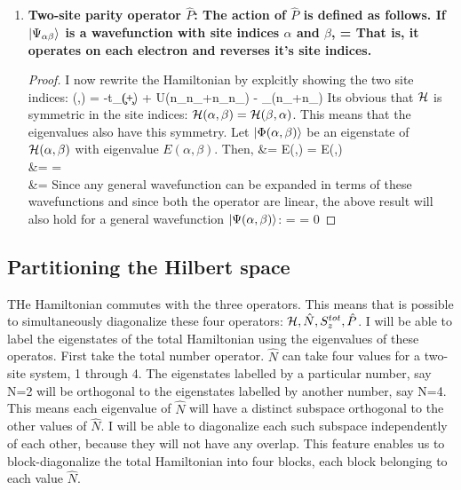 \documentclass{article}
\begin{document}
\begin{enumerate}
\item \bf{Two-site parity operator \(\hat{P}\)}: The action of \(\hat{P}\) is defined as follows. If \(\ket{\Psi_{\alpha\beta}}\) is a wavefunction with site indices \(\alpha\) and \(\beta\), 
\beq
{}\ket{\Psi(\alpha,\beta)} = \ket{\Psi(\beta,\alpha)}
\eeq
That is, it operates on each electron and reverses it's site indices. 
\begin{proof}
I now rewrite the Hamiltonian by explcitly showing the two site indices:
\beq
\ham(\alpha,\beta) = -t\sum_\sigma(\C{\alpha}{\sigma}\c{\beta}{\sigma}+\C{\beta}{\sigma}\c{\alpha}{\sigma}) + U(n_{\alpha\uparrow}n_{\alpha\downarrow}+n_{\beta\uparrow}n_{\beta\downarrow}) - \mu\sum_\sigma(n_{\alpha\sigma}+n_{\beta\sigma})
\eeq 
Its obvious that \(\mathcal{H}\) is symmetric in the site indices: \(\mathcal{H}(\alpha,\beta) = \mathcal{H}(\beta,\alpha)\). This means that the eigenvalues also have this symmetry. Let \(\ket{\Phi(\alpha,\beta)}\) be an eigenstate of \(\mathcal{H}(\alpha,\beta)\) with eigenvalue \(E(\alpha,\beta)\). Then,
\beq
{}\ham\ket{\Phi(\alpha,\beta)} &= E(\alpha,\beta) \ket{\Phi(\alpha,\beta)} = E(\beta,\alpha) \ket{\Phi(\beta,\alpha)} \\
&= \ham \ket{\Phi(\beta,\alpha)} = \ham {} \ket{\Phi(\alpha,\beta)} \\
\implies \ham{}\ket{\Phi(\alpha,\beta)} &= \ham\ket{\Phi(\alpha,\beta)}
\eeq
Since any general wavefunction can be expanded in terms of these wavefunctions and since both the operator are linear, the above result will also hold for a general wavefunction \(\ket{\Psi(\alpha,\beta)}\):
\beq
\ham {} \ket{\Psi(\alpha,\beta)} =  \ham \ket{\Psi(\alpha,\beta)}
 = 0
\eeq
\end{proof}
\end{enumerate}
\subsection{Partitioning the Hilbert space}
THe Hamiltonian commutes with the three operators. This means that is possible to simultaneously diagonalize these four operators: \(\mathcal{H}, \hat{N}, S_z^{tot}, \hat{P}\). I will be able to label the eigenstates of the total Hamiltonian using the eigenvalues of these operatos. First take the total number operator. \(\hat{N}\) can take four values for a two-site system, 1 through 4. The eigenstates labelled by a particular number, say N=2 will be orthogonal to the eigenstates labelled by another number, say N=4. This means each eigenvalue of \(\hat{N}\) will have a distinct subspace orthogonal to the other values of \(\hat{N}\). I will be able to diagonalize each such subspace independently of each other, because they will not have any overlap. This feature enables us to block-diagonalize the total Hamiltonian into four blocks, each block belonging to each value \(\hat{N}\). 
\end{document}
